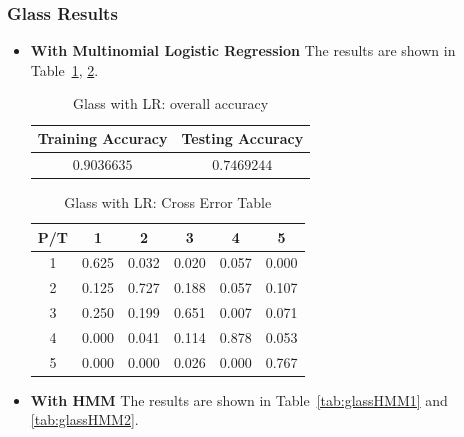 \subsubsection{Glass Results}
\label{sec:glassresult}
\begin{itemize}
\item \textbf{With Multinomial Logistic Regression} 
The results are shown in Table~\ref{tab:glassLR1}, \ref{tab:glassLR2}.

\begin{table}[!htb]
\begin{center}
\begin{tabular}{c|c}
      \hline
      Training Accuracy & Testing Accuracy\\
      \hline
      $0.9036635$ & $0.7469244$ \\
      \hline
\end{tabular}
\caption{Glass with LR: overall accuracy}
\label{tab:glassLR1}
\end{center}
\end{table}

\begin{table}[!htb]
\begin{center}
\begin{tabular}{c|c|c|c|c|c}
      \hline
      P/T& 1 & 2 &3 & 4 & 5 \\
      \hline
      1 &0.625&0.032&0.020&0.057&0.000\\
      2 &0.125&0.727&0.188&0.057&0.107\\
      3 &0.250&0.199&0.651&0.007&0.071\\
      4 &0.000&0.041&0.114&0.878&0.053\\
      5 & 0.000&0.000&0.026&0.000&0.767\\
      \hline
\end{tabular}
\caption{Glass with LR: Cross Error Table}
\label{tab:glassLR2}
\end{center}
\end{table}
\item \textbf{With HMM}
The results are shown in Table~\ref{tab:glassHMM1} and \ref{tab:glassHMM2}.


\end{itemize}
